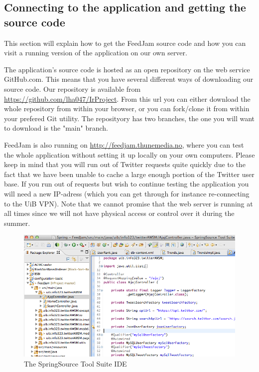 \subsection{Connecting to the application and getting the source code}
This section will explain how to get the FeedJam source code and how you can visit a running version of the application on our own server.

The application's source code is hosted as an open repository on the web service GitHub.com. This means that you have several different ways of downloading our source code. Our repository is available from \url{https://github.com/lha047/IrProject}. From this url you can either download the whole repository from within your browser, or you can fork/clone it from within your prefered Git utility. The reposityory has two branches, the one you will want to download is the "main" branch.

FeedJam is also running on \url{http://feedjam.thunemedia.no}, where you can test the whole application without setting it up locally on your own computers. Please keep in mind that you will run out of Twitter requests quite quickly due to the fact that we have been unable to cache a large enough portion of the Twitter user base. If you run out of requests but wish to continue testing the application you will need a new IP-adress (which you can get through for instance re-connecting to the UiB VPN). Note that we cannot promise that the web server is running at all times since we will not have physical access or control over it during the summer. 

\begin{figure}[ht]
    \begin{minipage}[b]{1\linewidth}
        \centering
        \includegraphics[width=1\textwidth]{figures/springsourcetoolsuite}
        \caption{The SpringSource Tool Suite IDE}
        \label{fig:springsourcetoolsuite}
    \end{minipage}
\end{figure}